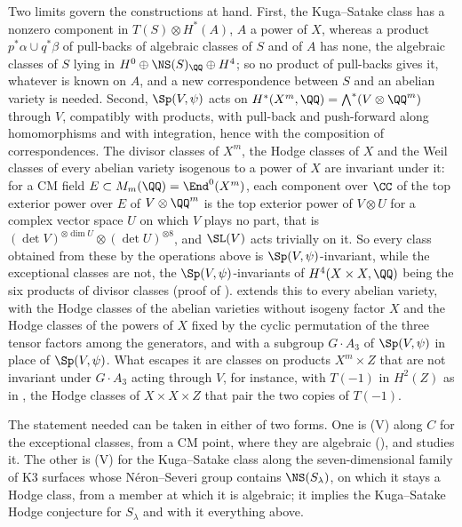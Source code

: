 \begin{remark}
Two limits govern the constructions at hand.
First, the Kuga--Satake class has a nonzero component in $T(S)\otimes
H^{*}(A)$, $A$ a power of $X$, whereas a product $p^{*}\alpha\cup q^{*}\beta$
of pull-backs of algebraic classes of $S$ and of $A$ has none, the algebraic
classes of $S$ lying in $H^{0}\oplus\NS(S)_{\QQ}\oplus H^{4}$; so no product
of pull-backs gives it, whatever is known on $A$, and a new correspondence
between $S$ and an abelian variety is needed. Second, $\Sp(V,\psi)$ acts on
$H^{*}(X^{m},\QQ)=\bigwedge^{*}(V\otimes\QQ^{m})$ through $V$, compatibly with
products, with pull-back and push-forward along homomorphisms and with
integration, hence with the composition of correspondences. The divisor
classes of $X^{m}$, the Hodge classes of $X$ and the Weil classes of every
abelian variety isogenous to a power of $X$ are invariant under it: for a CM
field $E\subset M_{m}(\QQ)=\End^{0}(X^{m})$, each component over $\CC$ of
the top exterior power over $E$ of $V\otimes\QQ^{m}$ is the top exterior power
of $V\otimes U$ for a complex vector space $U$ on which $V$ plays no part,
that is $(\det V)^{\otimes\dim U}\otimes(\det U)^{\otimes8}$, and $\SL(V)$ acts
trivially on it. So every class obtained from these by the operations
above is $\Sp(V,\psi)$-invariant, while the exceptional classes are not, the
$\Sp(V,\psi)$-invariants of $H^{4}(X\times X,\QQ)$ being the six products of
divisor classes (proof of ).
 extends this to every abelian variety, with the
Hodge classes of the abelian varieties without isogeny factor $X$ and the
Hodge classes of the powers of $X$ fixed by the cyclic permutation of the
three tensor factors among the generators, and with a subgroup $G\cdot A_{3}$
of $\Sp(V,\psi)$ in place of $\Sp(V,\psi)$. What escapes it are classes on
products $X^{m}\times Z$ that are not invariant under $G\cdot A_{3}$ acting
through $V$, for instance, with $T(-1)$ in $H^{2}(Z)$ as in
, the Hodge classes of $X\times X\times Z$ that pair
the two copies of $T(-1)$.

The statement needed can be taken in either of two forms. One is \textup{(V)} along $C$ for the exceptional classes, from a
CM point, where they are algebraic (), and
 studies it. The other
is \textup{(V)} for the Kuga--Satake class along the seven-dimensional family
of K3 surfaces whose N\'eron--Severi group contains $\NS(S_{\lambda})$, on
which it stays a Hodge class, from a member at which it is algebraic; it
implies the Kuga--Satake Hodge conjecture for $S_{\lambda}$ and with it
everything above.


\end{remark}
